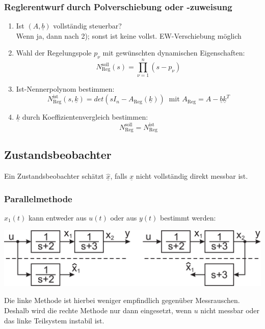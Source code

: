 \documentclass[a4paper,twocolumn,10pt]{article}
\begin{document}
\subsubsection{Reglerentwurf durch Polverschiebung oder -zuweisung}
\begin{enumerate}
\item Ist $(A,\underline{b})$ vollständig steuerbar?\\
Wenn ja, dann nach 2); sonst ist keine vollst. EW-Verschiebung möglich
\item Wahl der Regelungspole $p_{\nu}$ mit gewünschten dynamischen Eigenschaften:
\begin{equation*}
N_{\text{Reg}}^{\text{soll}}(s)=\prod\limits_{\nu=1}^n(s-p_{\nu})
\end{equation*}
\item Ist-Nennerpolynom bestimmen:
\begin{equation*}
N_{\text{Reg}}^{\text{ist}}(s,\underline{k})=det\left(sI_n-A_{\text{Reg}}(\underline{k})\right)\;\;\text{mit }A_{\text{Reg}}=A-\underline{b}\underline{k}^T
\end{equation*}
\item $\underline{k}$ durch Koeffizientenvergleich bestimmen:
\begin{equation*}
N_{\text{Reg}}^{\text{soll}}=N_{\text{Reg}}^{\text{ist}}
\end{equation*}
\end{enumerate}

\subsection{Zustandsbeobachter}
Ein Zustandsbeobachter schätzt $\underline{\hat{x}}$, falls $\underline{x}$ nicht vollständig direkt messbar ist.

\subsubsection{Parallelmethode}
$x_1(t)$ kann entweder aus $u(t)$ oder aus $y(t)$ bestimmt werden:
\begin{center}
\includegraphics[width=0.95\columnwidth]{Grafiken/Parallelmodellmethode}
\end{center}
Die linke Methode ist hierbei weniger empfindlich gegenüber Messrauschen.\\
Deshalb wird die rechte Methode nur dann eingesetzt, wenn $u$ nicht messbar oder das linke Teilsystem instabil ist.
\end{document}
